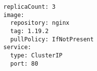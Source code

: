 \begin{verbatim}
replicaCount: 3
image:
  repository: nginx
  tag: 1.19.2
  pullPolicy: IfNotPresent
service:
  type: ClusterIP
  port: 80
\end{verbatim}
